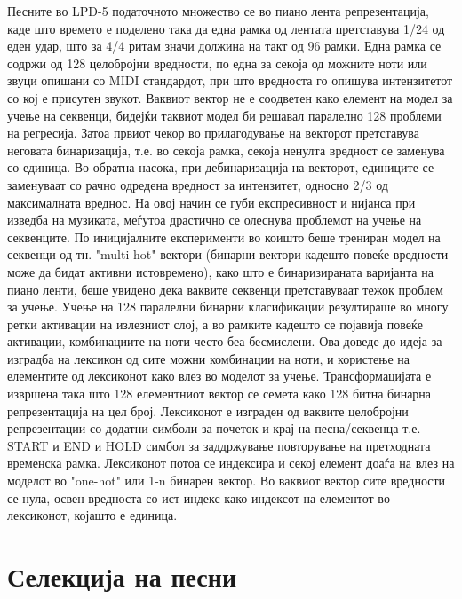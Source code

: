 Песните во LPD-5 податочното множество се во пиано лента репрезентација, каде што времето е поделено така да една рамка од лентата претставува 1/24 од еден удар, што за 4/4 ритам значи должина на такт од 96 рамки. Една рамка се содржи од 128 целобројни вредности, по една за секоја од можните ноти или звуци опишани со MIDI стандардот, при што вредноста го опишува интензитетот со кој е присутен звукот. Ваквиот вектор не е соодветен како елемент на модел за учење на секвенци, бидејќи таквиот модел би решавал паралелно 128 проблеми на регресија. Затоа првиот чекор во прилагодување на векторот претставува неговата бинаризација, т.е. во секоја рамка, секоја ненулта вредност се заменува со единица. Во обратна насока, при дебинаризација на векторот, единиците се заменуваат со рачно одредена вредност за интензитет, односно 2/3 од максималната вреднос. На овој начин се губи експресивност и нијанса при изведба на музиката, меѓутоа драстично се олеснува проблемот на учење на секвенците. 
По иницијалните експерименти во коишто беше трениран модел на секвенци од тн. "multi-hot" вектори (бинарни вектори кадешто повеќе вредности може да бидат активни истовремено), како што е бинаризираната варијанта на пиано ленти, беше увидено дека ваквите секвенци претставуваат тежок проблем за учење. Учење на 128 паралелни бинарни класификации резултираше во многу ретки активации на излезниот слој, а во рамките кадешто се појавија повеќе активации, комбинациите на ноти често беа бесмислени. Ова доведе до идеја за изградба на лексикон од сите можни комбинации на ноти, и користење на елементите од лексиконот како влез во моделот за учење. Трансформацијата е извршена така што 128 елементниот вектор се семета како 128 битна бинарна репрезентација на цел број. Лексиконот е изграден од ваквите целобројни репрезентации со додатни симболи за почеток и крај на песна/секвенца т.е. START и END и HOLD симбол за заддржување повторување на претходната временска рамка. Лексиконот потоа се индексира и секој елемент доаѓа на влез на моделот во "one-hot" или 1-n бинарен вектор. Во ваквиот вектор сите вредности се нула, освен вредноста со ист индекс како индексот на елементот во лексиконот, којашто е единица.

\section{Селекција на песни}

